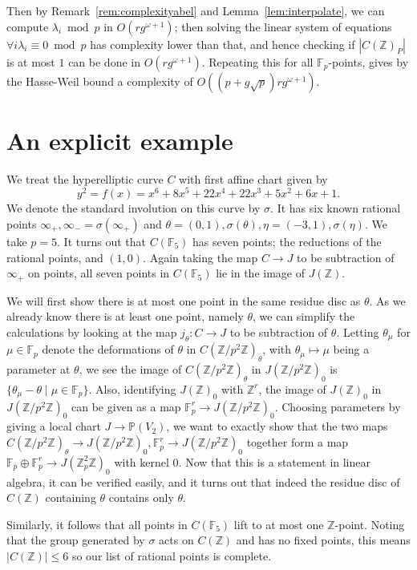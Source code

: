 \documentclass[12pt]{article}
\newcommand{\Z}{\mathbb{Z}}
\renewcommand{\P}{\mathbb{P}}
\newcommand{\F}{\mathbb{F}}
\theoremstyle{plain}
\theoremstyle{definition}
\theoremstyle{remark}
\begin{document}
Then by Remark~\ref{rem:complexityabel} and Lemma~\ref{lem:interpolate}, we can compute $\lambda_i \bmod p$ in $O(rg^{\omega+1})$; then solving the linear system of equations $\forall i \lambda_i \equiv 0 \bmod p$ has complexity lower than that, and hence checking if $|C(\Z)_P|$ is at most $1$ can be done in $O(rg^{\omega+1})$. Repeating this for all $\F_p$-points, gives by the Hasse-Weil bound a complexity of $O\left((p + g\sqrt{p})rg^{\omega+1}\right)$.

\section{An explicit example}
\label{section:example}
We treat the hyperelliptic curve $C$ with first affine chart given by
\[
y^2 = f(x) = x^6+ 8x^5+ 22x^4+ 22x^3+ 5x^2+ 6x+ 1.
\]
We denote the standard involution on this curve by $\sigma$. It has six known rational points $\infty_+,\infty_- = \sigma(\infty_+)$ and $\theta = (0,1),\sigma(\theta),\eta=(-3,1),\sigma(\eta)$. We take $p = 5$. It turns out that $C(\F_5)$ has seven points; the reductions of the rational points, and $(1,0)$. Again taking the map $C \to J$ to be subtraction of $\infty_+$ on points, all seven points in $C(\F_5)$ lie in the image of $J(\Z)$.

We will first show there is at most one point in the same residue disc as $\theta$. As we already know there is at least one point, namely $\theta$, we can simplify the calculations by looking at the map $j_{\theta}: C \to J$ to be subtraction of $\theta$. Letting $\theta_{\mu}$ for $\mu \in \F_p$ denote the deformations of $\theta$ in $C(\Z/p^2\Z)_{\theta}$, with $\theta_\mu \mapsto \mu$ being a parameter at $\theta$, we see the image of $C(\Z/p^2\Z)_\theta$ in $J(\Z/p^2\Z)_0$ is $\{\theta_\mu - \theta \mid \mu \in \F_p\}$. Also, identifying $J(\Z)_0$ with $\Z^r$, the image of $J(\Z)_0$ in $J(\Z/p^2\Z)_0$ can be given as a map $\F_p^r \to J(\Z/p^2\Z)_0$. Choosing parameters by giving a local chart $J \to \P(V_2)$, we want to exactly show that the two maps $C(\Z/p^2\Z)_\theta \to J(\Z/p^2\Z)_0, \F_p^r \to J(\Z/p^2\Z)_0$ together form a map $\F_p \oplus \F_p^r \to J(\Z_p^2\Z)_0$ with kernel $0$. Now that this is a statement in linear algebra, it can be verified easily, and it turns out that indeed the residue disc of $C(\Z)$ containing $\theta$ contains only $\theta$.

Similarly, it follows that all points in $C(\F_5)$ lift to at most one $\Z$-point. Noting that the group generated by $\sigma$ acts on $C(\Z)$ and has no fixed points, this means $|C(\Z)| \leq 6$ so our list of rational points is complete.
\end{document}
